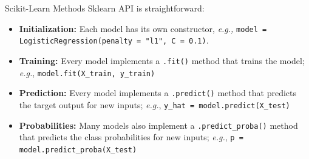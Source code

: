 \documentclass[10pt, aspectratio=169]{beamer} %
\begin{document}
\begin{frame}[fragile,allowframebreaks=0.8]{Scikit-Learn Methods}
Sklearn API is straightforward:
\begin{itemize}
\item \textbf{Initialization:} Each model has its own constructor, \textit{e.g.,}
\verb+model = LogisticRegression(penalty = "l1", C = 0.1)+.
\item \textbf{Training:} Every model implements a \verb+.fit()+ method that
trains the model; \textit{e.g.}, 
\verb+model.fit(X_train, y_train)+
\item \textbf{Prediction:} Every model implements a \verb+.predict()+ method that
predicts the target output for new inputs; \textit{e.g.}, 
\verb+y_hat = model.predict(X_test)+
\item \textbf{Probabilities:} Many models also implement a \verb+.predict_proba()+ method that
predicts the class probabilities for new inputs; \textit{e.g.}, 
\verb+p = model.predict_proba(X_test)+
\end{itemize}
\end{frame}
\end{document}
